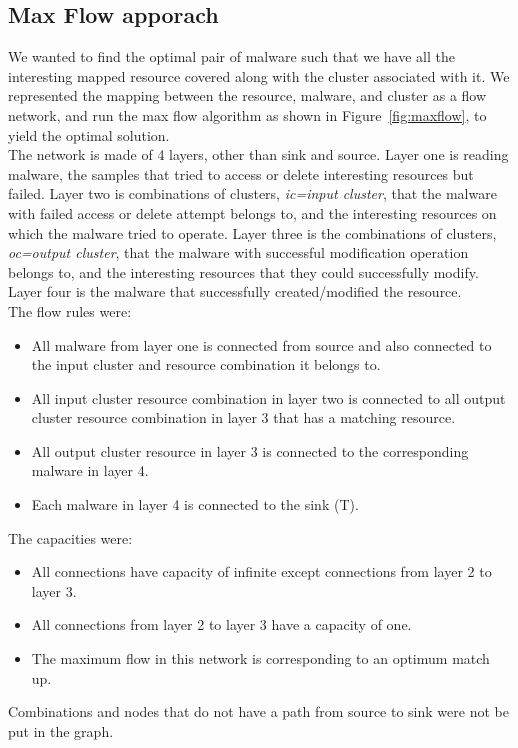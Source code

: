 \subsection{Max Flow apporach}
\label{sub:Max Flow apporach}
We wanted to find the optimal pair of malware such that we have all the interesting mapped resource covered along with the cluster associated with it.
We represented the mapping between the resource, malware, and cluster as a flow network, and run the max flow algorithm as shown in Figure~\ref{fig:maxflow}, to yield the optimal solution.\\
The network is made of 4 layers, other than sink and source. Layer one is reading malware, the samples that tried to access or delete interesting resources but failed.
Layer two is combinations of clusters, \emph{ic=input cluster}, that the malware with failed access or delete attempt belongs to, and the interesting resources on which the malware tried to operate.
Layer three is the combinations of clusters, \emph{oc=output cluster}, that the malware with successful modification operation belongs to, and the interesting resources that they could successfully modify.
Layer four is the malware that successfully created/modified the resource.\\
The flow rules were:
\begin{itemize}
  \item All malware from layer one is connected from source and also connected to the input cluster and resource combination it belongs to.
  \item All input cluster resource combination in layer two is connected to all output cluster resource combination in layer 3 that has a matching resource.
  \item All output cluster resource in layer 3 is connected to the corresponding malware in layer 4.
  \item Each malware in layer 4 is connected to the sink (T).
\end{itemize}
The capacities were:
\begin{itemize}
  \item All connections have capacity of infinite except connections from layer 2 to layer 3.
  \item All connections from layer 2 to layer 3 have a capacity of one.
  \item The maximum flow in this network is corresponding to an optimum match up.
\end{itemize}
Combinations and nodes that do not have a path from source to sink were not be put in the graph.\\

